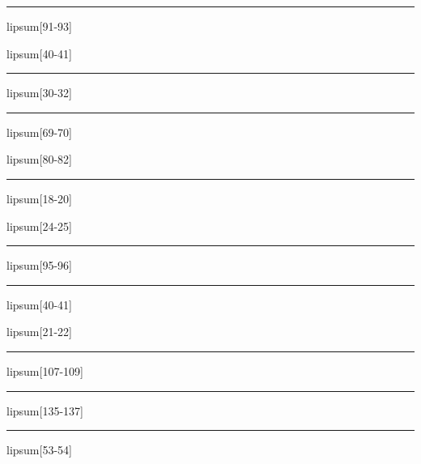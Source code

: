 \documentclass[11pt,a4paper]{article}
\begin{document}
\begin{simplewrap}
  \textcolor{olive!56}{\rule{3.2cm}{4.3cm}}
\end{simplewrap}
lipsum[91-93]

lipsum[40-41]

\begin{simplewrap}
  \textcolor{red!24}{\rule{5.5cm}{4.8cm}}
\end{simplewrap}
lipsum[30-32]

\begin{simplewrap}
  \textcolor{magenta!37}{\rule{5.5cm}{9.8cm}}
\end{simplewrap}
lipsum[69-70]

lipsum[80-82]

\begin{simplewrap}
  \textcolor{brown!32}{\rule{3.0cm}{9.0cm}}
\end{simplewrap}
lipsum[18-20]

lipsum[24-25]

\begin{simplewrap}
  \textcolor{cyan!23}{\rule{4.1cm}{5.6cm}}
\end{simplewrap}
lipsum[95-96]

\begin{simplewrap}
  \textcolor{brown!59}{\rule{5.8cm}{6.8cm}}
\end{simplewrap}
lipsum[40-41]

lipsum[21-22]

\begin{simplewrap}
  \textcolor{teal!38}{\rule{5.0cm}{5.9cm}}
\end{simplewrap}
lipsum[107-109]

\begin{simplewrap}
  \textcolor{cyan!17}{\rule{4.0cm}{2.9cm}}
\end{simplewrap}
lipsum[135-137]

\begin{simplewrap}
  \textcolor{blue!24}{\rule{4.2cm}{6.8cm}}
\end{simplewrap}
lipsum[53-54]
\end{document}
